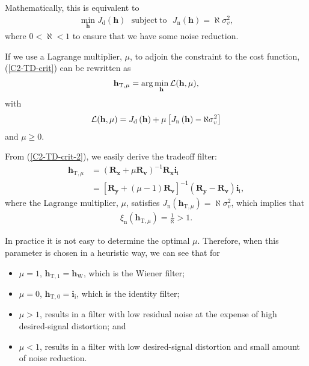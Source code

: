 \documentclass[10pt,pdflatex,headrule,landscape]{beamer}
\begin{document}
\begin{frame}[allowframebreaks]

Mathematically, this is equivalent to
\begin{eqnarray}
 \label{C2-TD-crit}
 \min_{ \mathbf{h} } J_{\mathrm{d}}\left( \mathbf{h} \right) \ \ \ \mathrm{subject \ to} \ \ \
 J_{\mathrm{n}}\left( \mathbf{h} \right) = \aleph \sigma_v^2 ,
\end{eqnarray}
where $0 < \aleph < 1$ to ensure that we have some noise reduction.

If we use a Lagrange multiplier, $\mu$, to
adjoin the constraint to the cost function, (\ref{C2-TD-crit}) can be rewritten as
\begin{eqnarray}
\label{C2-TD-crit-2}
 \mathbf{h}_{\mathrm{T},\mu} = \arg \min_{\mathbf{h}} {\cal L}(\mathbf{h}, \mu),
\end{eqnarray}
with
\begin{eqnarray}
 {\cal L}(\mathbf{h}, \mu) = J_{\mathrm{d}}\left( \mathbf{h} \right) + \mu
 \left[ J_{\mathrm{n}}\left( \mathbf{h} \right) - \aleph \sigma_v^2 \right]
\end{eqnarray}
and $\mu \geq 0$.

From (\ref{C2-TD-crit-2}), we easily derive the tradeoff filter:
\begin{align}
\label{C2-trdf-filt}
 \mathbf{h}_{\mathrm{T},\mu} &= \left( \mathbf{R}_{\mathbf{x}} + \mu \mathbf{R}_{\mathbf{v}} \right)^{-1}
 \mathbf{R}_{\mathbf{x}} \mathbf{i}_{\mathrm{i}} \\
 &= \left[ \mathbf{R}_{\mathbf{y}} + (\mu - 1) \mathbf{R}_{\mathbf{v}} \right]^{-1}
 \left( \mathbf{R}_{\mathbf{y}} - \mathbf{R}_{\mathbf{v}} \right) \mathbf{i}_{\mathrm{i}}, \nonumber
\end{align}
where the Lagrange multiplier, $\mu$, satisfies $J_{\mathrm{n}}\left( \mathbf{h}_{\mathrm{T},\mu} \right) = \aleph \sigma_v^2$, which implies that
\begin{eqnarray}
 \xi_{\mathrm{n}}\left( \mathbf{h}_{\mathrm{T},\mu} \right) = \frac{1}{\aleph} > 1.
\end{eqnarray}

\end{frame}
\begin{frame}[allowframebreaks]

In practice it is not easy to determine the optimal $\mu$. Therefore, when this parameter is chosen in a heuristic way, we can see that for
\begin{itemize}
 \item $\mu = 1$, $\mathbf{h}_{\mathrm{T},1} = \mathbf{h}_{\mathrm{W}}$, which is the Wiener filter;
 \item $\mu = 0$, $\mathbf{h}_{\mathrm{T},0} = \mathbf{i}_{\mathrm{i}}$, which is the identity filter;
 \item $\mu > 1$, results in a filter with low residual noise at the expense of high desired-signal distortion; and
 \item $\mu < 1$, results in a filter with low desired-signal distortion and small amount of noise reduction.
\end{itemize}

\end{frame}
\end{document}
